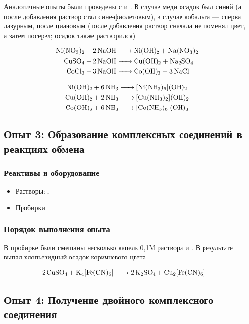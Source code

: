 \documentclass[a4paper, 12pt]{article}
\begin{document}
Аналогичные опыты были проведены с  и . В случае меди осадок был синий (а после добавления  раствор стал сине-фиолетовым), в случае кобальта --- сперва лазурным, после циановым (после добавления  раствор сначала не поменял цвет, а затем посерел; осадок также растворился).

\begin{align}
	\ce{Ni(NO3)2 + 2NaOH &-> Ni(OH)2 + Na(NO3)2} \\
	\ce{CuSO4 + 2NaOH &-> Cu(OH)2 + Na2SO4} \\
	\ce{CoCl3 + 3NaOH &-> Co(OH)3 + 3 NaCl} 
\end{align}

\begin{align}
	\ce{Ni(OH)2 + 6 NH3 &-> [Ni(NH3)6](OH)2} \\
	\ce{Cu(OH)2 + 2 NH3 &-> [Cu(NH3)2](OH)2} \\
	\ce{Co(OH)3 + 6 NH3 & -> [Co(NH3)6](OH)3}
\end{align}


\subsection{Опыт 3: Образование комплексных соединений в реакциях обмена}

\subsubsection{Реактивы и оборудование}

\begin{itemize}
	\item Растворы: , 
	
	\item Пробирки
\end{itemize}

\subsubsection{Порядок выполнения опыта}

В пробирке были смешаны несколько капель 0,1M раствора  и . В результате выпал хлопьевидный осадок коричневого цвета.

\begin{align*}
	\ce{2CuSO4 + K4[Fe(CN)6] &-> 2K2SO4 + Cu2[Fe(CN)6]}
\end{align*}


\subsection{Опыт 4: Получение двойного комплексного соединения}
\end{document}
